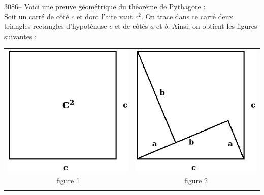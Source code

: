 \documentclass[letterpaper, 12pt]{article}
\begin{document}
3086-- Voici une preuve g\'eom\'etrique du th\'eor\`eme de Pythagore :\\
Soit un carr\'e de c\^ot\'e $c$ et dont l'aire vaut $c^{2}$. On trace dans ce carr\'e deux triangles rectangles d'hypot\'enuse $c$ et de c\^ot\'es $a$ et $b$. Ainsi, on obtient les figures suivantes :
\begin{center}
\begin{tabular}{c c}
\includegraphics[scale=0.35]{carrec2.eps} & \includegraphics[scale=0.35]{pythagore2.eps}\\
{\small figure 1} & {\small figure 2} \\
 & \\
\end{tabular}
\end{center}
\end{document}
